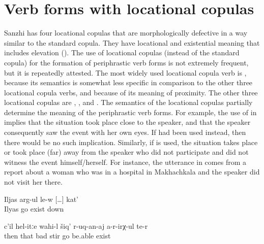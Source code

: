 
\section{Verb forms with locational copulas}
\label{sec:Verb forms with locational copulae}

Sanzhi has four locational copulas that are morphologically defective in a way similar to the standard copula. They have locational and existential meaning that includes elevation (). The use of locational copulas (instead of the standard copula) for the formation of periphrastic verb forms is not extremely frequent, but it is repeatedly attested. The most widely used locational copula verb is  , because its semantics is somewhat less specific in comparison to the other three locational copula verbs, and because of its meaning of proximity. The other three locational copulas are  ,  , and  . The semantics of the locational copulas partially determine the meaning of the periphrastic verb forms. For example, the use of  in  implies that the situation took place close to the speaker, and that the speaker consequently saw the event with her own eyes. If  had been used instead, then there would be no such implication. Similarly, if  is used, the situation takes place or took place (far) away from the speaker who did not participate and did not witness the event himself/herself. For instance, the utterance in  comes from a report about a woman who was in a hospital in Makhachkala and the speaker did not visit her there.
%
\begin{exe}
	\ex	\label{ex:Ilja is going downwards periphrastic}
	\gll	Iljas	arg-ul	le-w	[\ldots]	kat'\\
		Ilyas	go	exist	{}	down\\
	\glt	{}
	
	\ex	\label{ex:Then, badly like this, she is not able to move}
	\gll	c'il	hel-itːe	wahi-l	šiq'	r-uq-an-aj	a-r-irχ-ul	te-r\\
		then	that\tsc{-advz}	bad	stir	go be.able exist\\
	\glt	{}

\end{exe}

